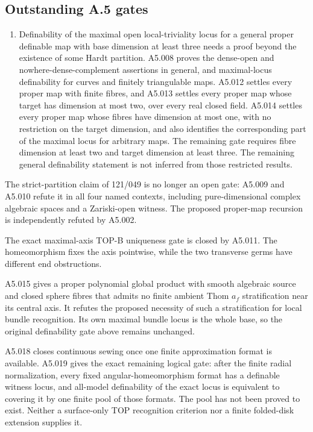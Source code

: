 \subsection*{Outstanding A.5 gates}
\begin{enumerate}
\item Definability of the maximal open local-triviality locus for a
general proper definable map with base dimension at least three needs a
proof beyond the existence of some Hardt partition.  A5.008 proves
the dense-open and nowhere-dense-complement assertions in general,
and maximal-locus definability for curves and finitely triangulable
maps. A5.012 settles every proper map with finite fibres, and
A5.013 settles every proper map whose target has dimension at most
two, over every real closed field.  A5.014 settles every proper
map whose fibres have dimension at most one, with no restriction
on the target dimension, and also identifies the corresponding
part of the maximal locus for arbitrary maps.  The remaining gate
requires fibre dimension at least two and target dimension at
least three.
The remaining general definability statement is not inferred
from those restricted results.
\end{enumerate}
The strict-partition claim of 121/049 is no longer an open gate:
A5.009 and A5.010 refute it in all four named contexts, including
pure-dimensional complex algebraic spaces and a Zariski-open
witness.  The proposed proper-map recursion is independently
refuted by A5.002.

The exact maximal-axis TOP-B uniqueness gate is closed by A5.011.
The homeomorphism fixes the axis pointwise, while the two transverse
germs have different end obstructions.

A5.015 gives a proper polynomial global product with smooth algebraic
source and closed sphere fibres that admits no finite ambient Thom
$a_f$ stratification near its central axis. It refutes the proposed
necessity of such a stratification for local bundle recognition.
Its own maximal bundle locus is the whole base, so the original
definability gate above remains unchanged.

A5.018 closes continuous sewing once one finite approximation format is
available. A5.019 gives the exact remaining logical gate: after the
finite radial normalization, every fixed angular-homeomorphism format
has a definable witness locus, and all-model definability of the exact
locus is equivalent to covering it by one finite pool of those formats.
The pool has not been proved to exist. Neither a surface-only TOP
recognition criterion nor a finite folded-disk extension supplies it.
